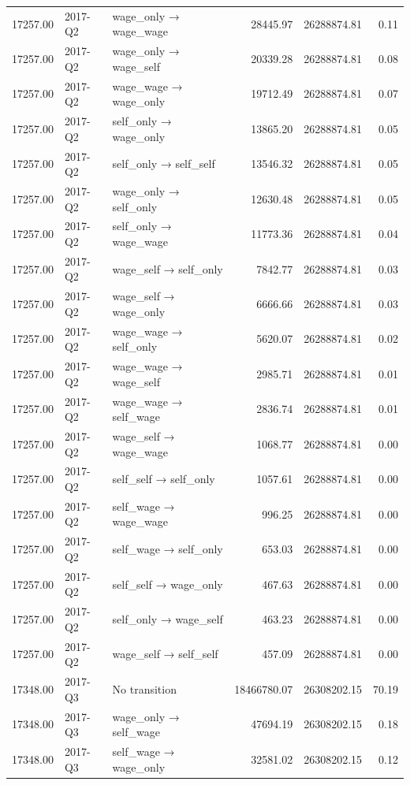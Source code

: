 \begin{table}[ht]
{\begin{tabular}{rllrrr}
  17257.00 & 2017-Q2 & wage\_only → wage\_wage & 28445.97 & 26288874.81 & 0.11 \\ 
  17257.00 & 2017-Q2 & wage\_only → wage\_self & 20339.28 & 26288874.81 & 0.08 \\ 
  17257.00 & 2017-Q2 & wage\_wage → wage\_only & 19712.49 & 26288874.81 & 0.07 \\ 
  17257.00 & 2017-Q2 & self\_only → wage\_only & 13865.20 & 26288874.81 & 0.05 \\ 
  17257.00 & 2017-Q2 & self\_only → self\_self & 13546.32 & 26288874.81 & 0.05 \\ 
  17257.00 & 2017-Q2 & wage\_only → self\_only & 12630.48 & 26288874.81 & 0.05 \\ 
  17257.00 & 2017-Q2 & self\_only → wage\_wage & 11773.36 & 26288874.81 & 0.04 \\ 
  17257.00 & 2017-Q2 & wage\_self → self\_only & 7842.77 & 26288874.81 & 0.03 \\ 
  17257.00 & 2017-Q2 & wage\_self → wage\_only & 6666.66 & 26288874.81 & 0.03 \\ 
  17257.00 & 2017-Q2 & wage\_wage → self\_only & 5620.07 & 26288874.81 & 0.02 \\ 
  17257.00 & 2017-Q2 & wage\_wage → wage\_self & 2985.71 & 26288874.81 & 0.01 \\ 
  17257.00 & 2017-Q2 & wage\_wage → self\_wage & 2836.74 & 26288874.81 & 0.01 \\ 
  17257.00 & 2017-Q2 & wage\_self → wage\_wage & 1068.77 & 26288874.81 & 0.00 \\ 
  17257.00 & 2017-Q2 & self\_self → self\_only & 1057.61 & 26288874.81 & 0.00 \\ 
  17257.00 & 2017-Q2 & self\_wage → wage\_wage & 996.25 & 26288874.81 & 0.00 \\ 
  17257.00 & 2017-Q2 & self\_wage → self\_only & 653.03 & 26288874.81 & 0.00 \\ 
  17257.00 & 2017-Q2 & self\_self → wage\_only & 467.63 & 26288874.81 & 0.00 \\ 
  17257.00 & 2017-Q2 & self\_only → wage\_self & 463.23 & 26288874.81 & 0.00 \\ 
  17257.00 & 2017-Q2 & wage\_self → self\_self & 457.09 & 26288874.81 & 0.00 \\ 
  17348.00 & 2017-Q3 & No transition & 18466780.07 & 26308202.15 & 70.19 \\ 
  17348.00 & 2017-Q3 & wage\_only → self\_wage & 47694.19 & 26308202.15 & 0.18 \\ 
  17348.00 & 2017-Q3 & self\_wage → wage\_only & 32581.02 & 26308202.15 & 0.12 \\ 

\end{tabular}}
\end{table}

